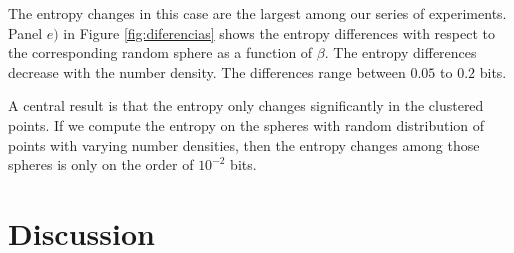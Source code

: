 \documentclass[fleqn,usenatbib]{mnras}
\begin{document}
The entropy changes in this case are the largest among our series of experiments.
Panel $e)$ in Figure \ref{fig:diferencias} shows the entropy differences 
with respect to the corresponding random sphere as a function
of $\beta$.
The entropy differences decrease with the number density. 
The differences range between $0.05$ to $0.2$ bits.

A central result is that the entropy only changes significantly in the
clustered points. 
If we compute the entropy on the spheres with random distribution of
points  with varying number densities, then the entropy changes among
those spheres  is only on the order of $10^{-2}$ bits. 

\section{Discussion}
\end{document}
